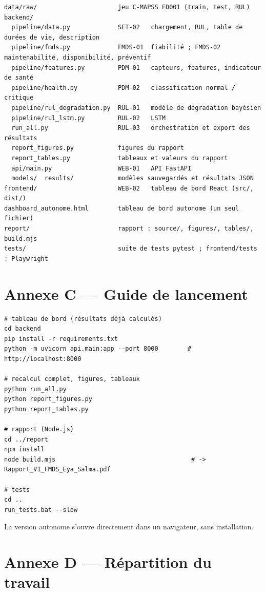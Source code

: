 \begin{verbatim}
data/raw/                      jeu C-MAPSS FD001 (train, test, RUL)
backend/
  pipeline/data.py             SET-02   chargement, RUL, table de durées de vie, description
  pipeline/fmds.py             FMDS-01  fiabilité ; FMDS-02 maintenabilité, disponibilité, préventif
  pipeline/features.py         PDM-01   capteurs, features, indicateur de santé
  pipeline/health.py           PDM-02   classification normal / critique
  pipeline/rul_degradation.py  RUL-01   modèle de dégradation bayésien
  pipeline/rul_lstm.py         RUL-02   LSTM
  run_all.py                   RUL-03   orchestration et export des résultats
  report_figures.py            figures du rapport
  report_tables.py             tableaux et valeurs du rapport
  api/main.py                  WEB-01   API FastAPI
  models/  results/            modèles sauvegardés et résultats JSON
frontend/                      WEB-02   tableau de bord React (src/, dist/)
dashboard_autonome.html        tableau de bord autonome (un seul fichier)
report/                        rapport : source/, figures/, tables/, build.mjs
tests/                         suite de tests pytest ; frontend/tests : Playwright
\end{verbatim}

\section*{Annexe C — Guide de lancement}

\begin{verbatim}
# tableau de bord (résultats déjà calculés)
cd backend
pip install -r requirements.txt
python -m uvicorn api.main:app --port 8000        # http://localhost:8000

# recalcul complet, figures, tableaux
python run_all.py
python report_figures.py
python report_tables.py

# rapport (Node.js)
cd ../report
npm install
node build.mjs                                     # -> Rapport_V1_FMDS_Eya_Salma.pdf

# tests
cd ..
run_tests.bat --slow
\end{verbatim}

La version autonome  s'ouvre directement dans un navigateur, sans installation.

\section*{Annexe D — Répartition du travail}\label{sec:annexe-repartition}

